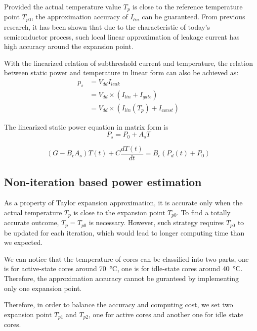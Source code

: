 Provided the actual temperature value $T_{p}$ is close to the reference temperature point $T_{p0}$, the approximation accuracy of $I_{lin}$ can be guaranteed. From previous research, it has been shown that due to the characteristic of today's semiconductor process, such local linear approximation of leakage current has high accuracy around the expansion point.

With the linearized relation of subthreshold current and temperature, the relation between static power and temperature in linear form can also be achieved as:
\begin{equation}\label{linear_static}
\begin{split}
p_{s} &= V_{dd}I_{leak}\\
&= V_{dd} \times (I_{lin}+I_{gate})\\
&= V_{dd} \times (I_{lin}(T_{p})+I_{const})
\end{split}
\end{equation}


The linearized static power equation in matrix form is
\begin{equation}\label{linear_static_matrix}
P_{s} = P_{0}+A_{s}T
\end{equation}

\begin{equation}\label{gt=bp}
(G - B_{c}A_{s})T(t) + C\frac{dT(t)}{dt} = B_{c}(P_{d}(t) + P_{0})
\end{equation}

\subsection{Non-iteration based power estimation}
As a property of Taylor expansion approximation, it is accurate only when the actual temperature $T_{p}$ is close to the expansion point $T_{p0}$. To find a totally accurate outcome, $T_{p} = T_{p0}$ is necessary. However, such strategy requires $T_{p0}$ to be updated for each iteration, which would lead to longer computing time than we expected. 

We can notice that the temperature of cores can be classified into two parts, one is for active-state cores around \SI{70}{\degreeCelsius}, one is for idle-state cores around \SI{40}{\degreeCelsius}. Therefore, the approximation accuracy cannot be guranteed by implementing only one expansion point. 

Therefore, in order to balance the accuracy and computing cost, we set two expansion point $T_{p1}$ and $T_{p2}$, one for active cores and another one for idle state cores.



